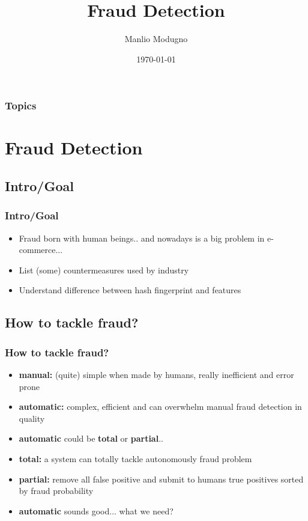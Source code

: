 \documentclass{beamer}
\title{Fraud Detection}
\author{Manlio Modugno}
\institute[GMTechnologies]
\date[]{\today}
\begin{document}
\begin{frame}
  \titlepage
\end{frame}

\begin{frame}
  \frametitle{Topics}
  \tableofcontents
\end{frame}


\section{Fraud Detection}
\subsection{Intro/Goal}
\begin{frame}
  \frametitle{Intro/Goal}
  \begin{itemize}
	\item<+-> Fraud born with human beings.. and nowadays is a big problem in e-commerce...
	\item<+-> List (some) countermeasures used by industry 
	\item<+-> Understand difference between hash fingerprint and features
   \end{itemize}
\end{frame}


\subsection{How to tackle fraud?}
\begin{frame}
  \frametitle{How to tackle fraud?}
  \begin{itemize}
	\item<+-> \textbf{manual:} (quite) simple when made by humans, really inefficient and error prone
	\item<+-> \textbf{automatic:} complex, efficient and can overwhelm manual fraud detection in quality
	\item<+-> \textbf{automatic} could be \textbf{total} or \textbf{partial}..
	\item<+-> \textbf{total:} a system can totally tackle autonomously fraud problem
	\item<+-> \textbf{partial:} remove all false positive and submit to humans true positives sorted by fraud probability
	\item<+-> \textbf{automatic} sounds good... what we need?
   \end{itemize}
\end{frame}
\end{document}
